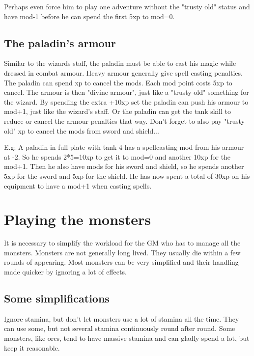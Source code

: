 Perhaps even force him to play one adventure without the "trusty old" status and have mod-1 before he can spend the first 5xp to mod=0.


\subsection*{The paladin's armour}
Similar to the wizards staff, the paladin must be able to cast his magic while dressed in combat armour. Heavy armour generally give spell casting penalties. The paladin can spend xp to cancel the mods. Each mod point costs 5xp to cancel. The armour is then "divine armour", just like a "trusty old" something for the wizard. By spending the extra +10xp set the paladin can push his armour to mod+1, just like the wizard's staff. 
Or the paladin can get the tank skill to reduce or cancel the armour penalties that way.
Don't forget to also pay "trusty old" xp to cancel the mods from sword and shield...

E.g: A paladin in full plate with tank 4 has a spellcasting mod from his armour at -2. So he spends 2*5=10xp to get it to mod=0 and another 10xp for the mod+1. Then he also have mods for his sword and shield, so he spends another 5xp for the sword and 5xp for the shield. He has now spent a total of 30xp on his equipment to have a mod+1 when casting spells.












\section*{Playing the monsters}
It is necessary to simplify the workload for the GM who has to manage all the monsters. Monsters are not generally long lived. They usually die within a few rounds of appearing. Most monsters can be very simplified and their handling made quicker by ignoring a lot of effects.


\subsection*{Some simplifications}
Ignore stamina, but don't let monsters use a lot of stamina all the time. They can use some, but not several stamina continuously round after round. Some monsters, like orcs, tend to have massive stamina and can gladly spend a lot, but keep it reasonable.

